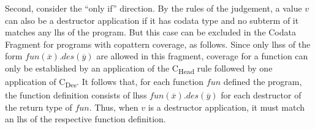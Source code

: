 Second, consider the ``only if'' direction. By the rules of the judgement, a value $v$ can also be a destructor application if it has codata type and no subterm of it matches any lhs of the program. But this case can be excluded in the Codata Fragment for programs with copattern coverage, as follows. Since only lhss of the form $fun(\overline{x}).des(\overline{y})$ are allowed in this fragment, coverage for a function can only be established by an application of the C\textsubscript{Head} rule followed by one application of C\textsubscript{Des}. It follows that, for each function $fun$ defined the program, the function definition consists of lhss $fun(\overline{x}).des(\overline{y})$ for each destructor of the return type of $fun$. Thus, when $v$ is a destructor application, it must match an lhs of the respective function definition.
